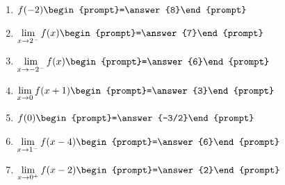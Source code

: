\documentclass[handout]{ximera}
\begin{document}
\begin{exercise}
\begin{enumerate}
\item $f(-2) \begin{prompt}=\answer{8}\end{prompt}$  

\item $\displaystyle\lim_{x\to 2^-} f(x) 
\begin{prompt}=\answer{7}\end{prompt}$  

\item $\displaystyle\lim_{x\to -2^-} f(x) \begin{prompt}=\answer{6}\end{prompt}$  

\item $\displaystyle\lim_{x\to 0} f(x+1) \begin{prompt}=\answer{3}\end{prompt}$  

\item $f(0) \begin{prompt}=\answer{-3/2}\end{prompt}$ 

\item $\displaystyle\lim_{x\to 1^-} f(x-4) \begin{prompt}=\answer{6}\end{prompt}$  

\item $\displaystyle\lim_{x\to 0^+} f(x-2) \begin{prompt}=\answer{2}\end{prompt}$

\end{enumerate}

\end{exercise}
\end{document}
